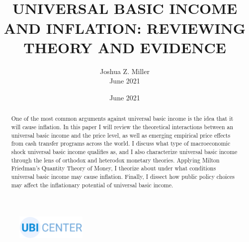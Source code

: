 \documentclass[paper=a4, fontsize=11pt,twoside]{scrartcl}
\title{\HRule{0.5pt} \\
\LARGE\textbf{\uppercase{Universal Basic Income and Inflation: Reviewing Theory and Evidence}}}
\author{Joshua Z. Miller \\
    June 2021
    \HRule{1.3pt}
    \affil{UBI Center} \\
}
\makeatletter
\def\printtitle{%
    {\centering \@title\par}}
\def\printauthor{%
    {\centering \large \@author}}
\makeatother
\begin{document}
\begin{titlepage}
\thispagestyle{empty}
\printtitle
\vspace{2mm}
\printauthor
\date{June 2021}


\begin{figure}[h]
\href{http://www.ubicenter.org}{\includegraphics[width=0.3\textwidth]{ubi_center_logo_wide_blue}}
\centering
\end{figure}
\begin{abstract}
\noindent One of the most common arguments against universal basic income is the idea that it will cause inflation. In this paper I will review the theoretical interactions between an universal basic income and the price level, as well as emerging empirical price effects from cash transfer programs across the world.  I discuss what type of macroeconomic shock universal basic income qualifies as, and I also characterize universal basic income through the lens of orthodox and heterodox monetary theories. Applying Milton Friedman’s Quantity Theory of Money, I theorize about under what conditions universal basic income may cause inflation. Finally, I dissect how public policy choices may affect the inflationary potential of universal basic income. \\
\end{abstract}
  \vfill
\tableofcontents
\pagebreak
\restoregeometry
\end{titlepage}
\hypersetup{linkcolor=blue}
\end{document}
